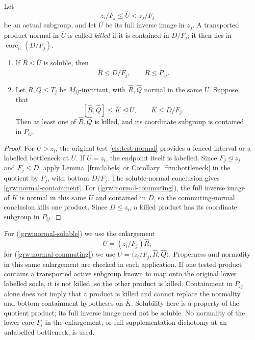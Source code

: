 \begin{lemma}
\label{grw:coordinate-normal-tests}
Let
\[
 z_i/F_j\le\overline U<z_j/F_j
\]
be an actual subgroup, and let $U$ be its full inverse image in
$z_j$.  A transported product normal in $\overline U$ is called
\emph{killed} if it is contained in $D/F_j$; it then lies in
$\operatorname{core}_{\overline U}(D/F_j)$.
\begin{enumerate}[label=\textup{(N\arabic*)},ref=N\arabic*]
\item\label{grw:normal-soluble}
If $\widehat R\trianglelefteq\overline U$ is soluble, then
\begin{equation}\label{grw:normal-containment}
 \widehat R\le D/F_j,\qquad R\le P_{ij}.
\end{equation}
\item\label{grw:normal-commuting}
Let $R,Q\le T_j$ be $M_{ij}$-invariant, with
$\widehat R,\widehat Q$ normal in the same $\overline U$.
Suppose that
\begin{equation}\label{grw:commuting-kernel}
 [\widehat R,\widehat Q]\le\overline K
       \trianglelefteq\overline U,\qquad
 \overline K\le D/F_j.
\end{equation}
Then at least one of $\widehat R,\widehat Q$ is killed, and
its coordinate subgroup is contained in $P_{ij}$.
\end{enumerate}
\end{lemma}

\begin{proof}
For $U>z_i$, the original test \ref{cls:test-normal} provides
a fenced interval or a labelled bottleneck at $U$.  If $U=z_i$,
the endpoint itself is labelled.  Since $F_j\trianglelefteq z_j$
and $F_j\le D$, apply Lemma~\ref{frm:labels} or
Corollary~\ref{frm:bottleneck} in the quotient by $F_j$, with
bottom $D/F_j$.  The soluble-normal conclusion gives
\eqref{grw:normal-containment}.  For
\textup{(\ref{grw:normal-commuting})}, the full inverse image of
$\overline K$ is normal in this same $U$ and contained in $D$,
so the commuting-normal conclusion kills one product.
Since $D\le z_i$, a killed product has its coordinate subgroup
in $P_{ij}$.
\end{proof}

For \textup{(\ref{grw:normal-soluble})} we use the enlargement
\begin{equation}\label{grw:normal-enlargement}
 \overline U=(z_i/F_j)\widehat R;
\end{equation}
for \textup{(\ref{grw:normal-commuting})} we use
$\overline U=\langle z_i/F_j,\widehat R,\widehat Q\rangle$.
Properness and normality in this same enlargement are checked
in each application.  If one tested product contains a transported
active subgroup known to map onto the original lower labelled
socle, it is not killed, so the other product is killed.
Containment in $P_{ij}$ alone does not imply that a product
is killed and cannot replace the normality and bottom-containment
hypotheses on $\overline K$.  Solubility here is a property of
the quotient product; its full inverse image need not be soluble.
No normality of the lower core $F_i$ in the enlargement, or full
supplementation dichotomy at an unlabelled bottleneck, is used.

